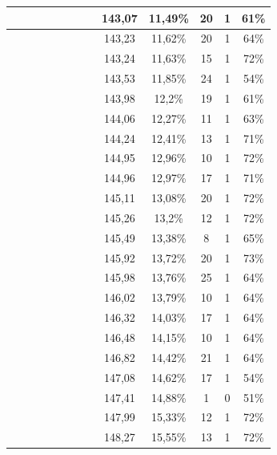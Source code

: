 \begin{center}
\begin{longtable}{|c|c|c|c|c|c|c|c|c|c|c|c|c|}
 \x &  \x &  &  &  \x &  &  &  \x & 143,07 & 11,49\% & 20 & 1 & 61\% \\ \hline
 \x &  \x &  \x &  &  &  &  \x &  \x & 143,23 & 11,62\% & 20 & 1 & 64\% \\ \hline
 \x &  &  \x &  \x &  &  \x &  &  \x & 143,24 & 11,63\% & 15 & 1 & 72\% \\ \hline
 \x &  \x &  &  \x &  &  &  &  \x & 143,53 & 11,85\% & 24 & 1 & 54\% \\ \hline
 \x &  \x &  &  &  \x &  &  &  & 143,98 & 12,2\% & 19 & 1 & 61\% \\ \hline
 \x &  \x &  \x &  &  \x &  &  &  \x & 144,06 & 12,27\% & 11 & 1 & 63\% \\ \hline
 \x &  \x &  \x &  &  &  \x &  \x &  & 144,24 & 12,41\% & 13 & 1 & 71\% \\ \hline
 \x &  &  &  \x &  \x &  \x &  &  & 144,95 & 12,96\% & 10 & 1 & 72\% \\ \hline
 \x &  \x &  \x &  &  \x &  \x &  &  & 144,96 & 12,97\% & 17 & 1 & 71\% \\ \hline
 \x &  &  &  &  &  \x &  &  \x & 145,11 & 13,08\% & 20 & 1 & 72\% \\ \hline
 \x &  \x &  &  \x &  \x &  \x &  &  & 145,26 & 13,2\% & 12 & 1 & 72\% \\ \hline
 \x &  \x &  \x &  \x &  &  &  &  \x & 145,49 & 13,38\% & 8 & 1 & 65\% \\ \hline
 \x &  &  \x &  &  \x &  \x &  \x &  & 145,92 & 13,72\% & 20 & 1 & 73\% \\ \hline
 \x &  &  \x &  &  \x &  &  \x &  \x & 145,98 & 13,76\% & 25 & 1 & 64\% \\ \hline
 \x &  &  \x &  &  &  &  \x &  \x & 146,02 & 13,79\% & 10 & 1 & 64\% \\ \hline
 \x &  \x &  \x &  \x &  &  &  \x &  \x & 146,32 & 14,03\% & 17 & 1 & 64\% \\ \hline
 \x &  &  \x &  \x &  &  &  &  \x & 146,48 & 14,15\% & 10 & 1 & 64\% \\ \hline
 \x &  &  \x &  &  \x &  &  &  & 146,82 & 14,42\% & 21 & 1 & 64\% \\ \hline
 \x &  \x &  &  &  &  &  \x &  \x & 147,08 & 14,62\% & 17 & 1 & 54\% \\ \hline
 \x &  &  &  \x &  &  &  &  & 147,41 & 14,88\% & 1 & 0 & 51\% \\ \hline
 \x &  \x &  &  \x &  \x &  \x &  \x &  \x & 147,99 & 15,33\% & 12 & 1 & 72\% \\ \hline
 \x &  \x &  \x &  \x &  &  \x &  \x &  & 148,27 & 15,55\% & 13 & 1 & 72\% \\ \hline

\end{longtable}
\end{center}
